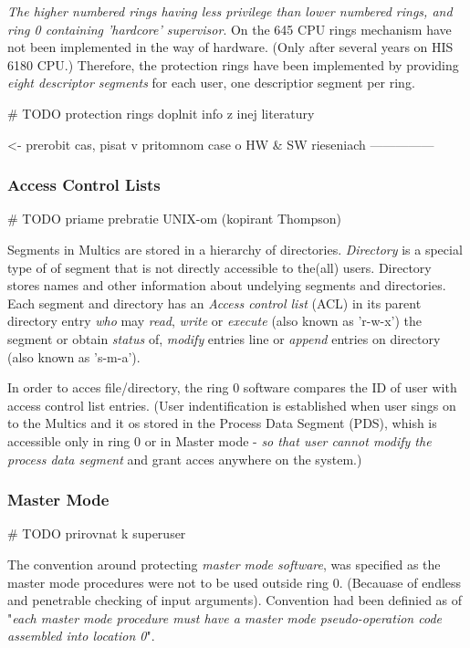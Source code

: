 \textit{The higher numbered rings having less privilege than lower numbered rings, and ring 0
containing 'hardcore' supervisor}. On the 645 CPU rings mechanism have not been implemented in the way of hardware.
(Only after several years on HIS 6180 CPU.) Therefore, the protection rings have been implemented by providing 
\textit{eight descriptor segments} for each user, one descriptior segment per ring.

# TODO protection rings doplnit info z inej literatury

<- prerobit cas, pisat v pritomnom case o HW & SW rieseniach
---------------

\subsubsection{Access Control Lists}
# TODO priame prebratie UNIX-om (kopirant Thompson)

Segments in Multics are stored in a hierarchy of directories. \textit{Directory} is a special type of of
segment that is not directly accessible to the(all) users.
Directory stores names and other information about undelying segments and directories.
Each segment and directory has an \textit{Access control list} (ACL) in its parent directory entry
\textit{who} may \textit{read}, \textit{write} or \textit{execute} (also known as 'r-w-x') the segment or obtain 
\textit{status} of, \textit{modify} entries line or \textit{append} entries on directory (also known as 's-m-a').

In order to acces file/directory, the ring 0 software compares the ID of user with access control list entries.
(User indentification is established when user sings on to the Multics and it os stored in the Process Data 
Segment (PDS), whish is accessible only in ring 0 or in Master mode - \textit{so that user cannot modify the
process data segment} and grant acces anywhere on the system.)

\subsubsection{Master Mode}
# TODO prirovnat k superuser

The convention around protecting \textit{master mode software}, was specified as the master mode procedures
were not to be used outside ring 0. (Becauase of endless and penetrable checking of input arguments).
Convention had been definied as of "\textit{each master mode procedure must have a master mode pseudo-operation
 code assembled into location 0}".

